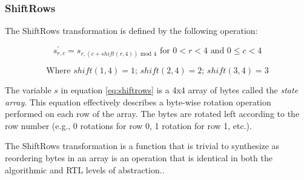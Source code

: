 \documentclass[11pt,journal,compsoc, onecolumn]{IEEEtran}
\begin{document}
\subsubsection{ShiftRows}\label{sec:shiftrows}
The ShiftRows transformation is defined by the following operation\cite{13}:

\begin{equation}\label{eq:shiftrows}
	s^{'}_{r,c}=s_{r,(c+shift(r,4))\text{ mod }4} \text{ for } 0<r<4 \text{ and } 0\leq c<4 
\end{equation}

\begin{equation}
	\text{Where } shift(1,4)=1\text{; } shift(2,4)=2\text{; } shift(3,4)=3
\end{equation}

The variable $s$ in equation \ref{eq:shiftrows} is a 4x4 array of bytes called the \emph{state array}. This equation effectively describes a byte-wise rotation operation performed on each row of the array. The bytes are rotated left according to the row number (e.g., 0 rotations for row 0, 1 rotation for row 1, etc.). 

The ShiftRows transformation is a function that is trivial to synthesize as reordering bytes in an array is an operation that is identical in both the algorithmic and RTL levels of abstraction.\cite{silva}. 
\end{document}
